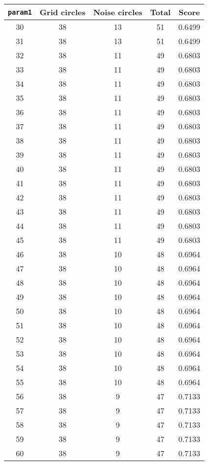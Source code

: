 \documentclass[letterpaper, 12pt]{article}
\begin{document}
\begin{longtable}{|c|c|c|c|c|}
\hline
\textbf{\texttt{param1}} & \textbf{Grid circles} & \textbf{Noise circles} & \textbf{Total} & \textbf{Score} \\
\hline
30 & 38 & 13 & 51 & 0.6499 \\
\hline
31 & 38 & 13 & 51 & 0.6499 \\
\hline
32 & 38 & 11 & 49 & 0.6803 \\
\hline
33 & 38 & 11 & 49 & 0.6803 \\
\hline
34 & 38 & 11 & 49 & 0.6803 \\
\hline
35 & 38 & 11 & 49 & 0.6803 \\
\hline
36 & 38 & 11 & 49 & 0.6803 \\
\hline
37 & 38 & 11 & 49 & 0.6803 \\
\hline
38 & 38 & 11 & 49 & 0.6803 \\
\hline
39 & 38 & 11 & 49 & 0.6803 \\
\hline
40 & 38 & 11 & 49 & 0.6803 \\
\hline
41 & 38 & 11 & 49 & 0.6803 \\
\hline
42 & 38 & 11 & 49 & 0.6803 \\
\hline
43 & 38 & 11 & 49 & 0.6803 \\
\hline
44 & 38 & 11 & 49 & 0.6803 \\
\hline
45 & 38 & 11 & 49 & 0.6803 \\
\hline
46 & 38 & 10 & 48 & 0.6964 \\
\hline
47 & 38 & 10 & 48 & 0.6964 \\
\hline
48 & 38 & 10 & 48 & 0.6964 \\
\hline
49 & 38 & 10 & 48 & 0.6964 \\
\hline
50 & 38 & 10 & 48 & 0.6964 \\
\hline
51 & 38 & 10 & 48 & 0.6964 \\
\hline
52 & 38 & 10 & 48 & 0.6964 \\
\hline
53 & 38 & 10 & 48 & 0.6964 \\
\hline
54 & 38 & 10 & 48 & 0.6964 \\
\hline
55 & 38 & 10 & 48 & 0.6964 \\
\hline
56 & 38 & 9 & 47 & 0.7133 \\
\hline
57 & 38 & 9 & 47 & 0.7133 \\
\hline
58 & 38 & 9 & 47 & 0.7133 \\
\hline
59 & 38 & 9 & 47 & 0.7133 \\
\hline
60 & 38 & 9 & 47 & 0.7133 \\

\end{longtable}
\end{document}

